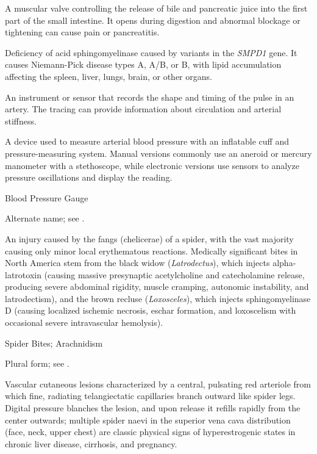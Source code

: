  A muscular valve controlling the release of bile and pancreatic juice into the first part of the small intestine. It opens during digestion and abnormal blockage or tightening can cause pain or pancreatitis.

 Deficiency of acid sphingomyelinase caused by variants in the \textit{SMPD1} gene. It causes Niemann-Pick disease types A, A/B, or B, with lipid accumulation affecting the spleen, liver, lungs, brain, or other organs.

 An instrument or sensor that records the shape and timing of the pulse in an artery. The tracing can provide information about circulation and arterial stiffness.

 A device used to measure arterial blood pressure with an inflatable cuff and pressure-measuring system. Manual versions commonly use an aneroid or mercury manometer with a stethoscope, while electronic versions use sensors to analyze pressure oscillations and display the reading.

\synonyms
Blood Pressure Gauge

 Alternate name; see .

 An injury caused by the fangs (chelicerae) of a spider, with the vast majority causing only minor local erythematous reactions. Medically significant bites in North America stem from the black widow (\textit{Latrodectus}), which injects alpha-latrotoxin (causing massive presynaptic acetylcholine and catecholamine release, producing severe abdominal rigidity, muscle cramping, autonomic instability, and latrodectism), and the brown recluse (\textit{Loxosceles}), which injects sphingomyelinase D (causing localized ischemic necrosis, eschar formation, and loxoscelism with occasional severe intravascular hemolysis).

\synonyms
Spider Bites; Arachnidism

 Plural form; see .

 Vascular cutaneous lesions characterized by a central, pulsating red arteriole from which fine, radiating telangiectatic capillaries branch outward like spider legs. Digital pressure blanches the lesion, and upon release it refills rapidly from the center outwards; multiple spider naevi in the superior vena cava distribution (face, neck, upper chest) are classic physical signs of hyperestrogenic states in chronic liver disease, cirrhosis, and pregnancy.

